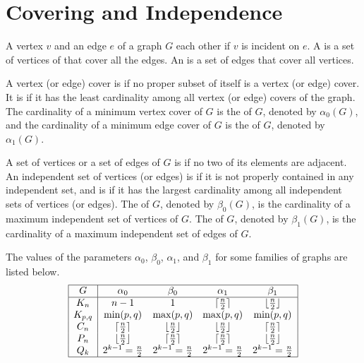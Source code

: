 \section{Covering and Independence}\label{sec:CoveringIndependence}

A vertex $v$ and an edge $e$ of a graph $G$  each other if $v$ is incident on $e$. A  is a set of vertices of that cover all the edges. An  is a set of edges that cover all vertices.

A vertex (or edge) cover is  if no proper subset of itself is a vertex (or edge) cover. It is  if it has the least cardinality among all vertex (or edge) covers of the graph. The cardinality of a minimum vertex cover of $G$ is the  of $G$, denoted by $\alpha_0(G)$, and the cardinality of a minimum edge cover of $G$ is the  of $G$, denoted by $\alpha_1(G)$.

A set of vertices or a set of edges of $G$ is  if no two of its elements are adjacent. An independent set of vertices (or edges) is  if it is not properly contained in any independent set, and is  if it has the largest cardinality among all independent sets of vertices (or edges). The  of $G$, denoted by $\beta_0(G)$, is the cardinality of a maximum independent set of vertices of $G$. The  of $G$, denoted by $\beta_1(G)$, is the cardinality of a maximum independent set of edges of $G$.

\begin{Example}\label{ex:CoveringIndependence}
The values of the parameters $\alpha_0$, $\beta_0$, $\alpha_1$, and $\beta_1$ for some families of graphs are listed below.
\def\arraystretch{1.4}
\begin{equation*}
\begin{array}{|c|cccc|}
\hline
G		&	\alpha_0			&	\beta_0				&	\alpha_1			&	\beta_1 \\
\hline
K_n		&	n - 1				&	1					&	\lceil\frac n 2\rceil	&	\lfloor\frac n 2\rfloor \\
K_{p,q}	&	\min(p, q)			&	\max(p, q)			&	\max(p, q)			&	\min(p, q) \\
C_n		&	\lceil\frac n 2\rceil	&	\lfloor\frac n 2\rfloor	&	\lfloor\frac n 2\rfloor	&	\lceil\frac n 2\rceil \\
P_n		&	\lfloor\frac n 2\rfloor	&	\lceil\frac n 2\rceil	&	\lceil\frac n 2\rceil	&	\lfloor\frac n 2\rfloor \\
Q_k		&	2^{k-1} = \frac n 2	&	2^{k-1} = \frac n 2	&	2^{k-1} = \frac n 2	&	2^{k-1} = \frac n 2 \\
\hline
\end{array}
\end{equation*}
\end{Example}


